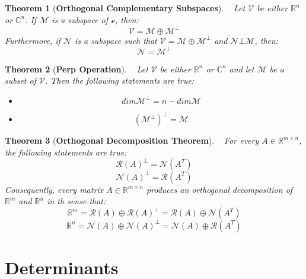 \documentclass[10.5pt]{article}
\newtheorem{theo}{Theorem}
\newenvironment{definition}[2][Definition]{\begin{trivlist}
\item[\hskip \labelsep {\bfseries #1}\hskip \labelsep {\bfseries #2.}]}{\end{trivlist}}
\begin{document}

\begin{theo}[\textbf{Orthogonal Complementary Subspaces}]
~ Let $\mathcal{V}$ be either $\mathbb{R}^n$ or $\mathbb{C}^n$. If $\mathcal{M}$ is a subspace of $\mathcal{v}$, then:
$$\mathcal{V}=\mathcal{M}\oplus \mathcal{M}^{\bot}$$
Furthermore, if $\mathcal{N}$ is a subspace such that $\mathcal{V}=\mathcal{M}\oplus \mathcal{M}^{\bot}$ and $\mathcal{N}\bot \mathcal{M}$, then:
$$\mathcal{N}= \mathcal{M}^{\bot}$$
\end{theo}

\begin{theo}[\textbf{Perp Operation}]
~ Let $\mathcal{V}$ be either $\mathbb{R}^n$ or $\mathbb{C}^n$ and let $\mathcal{M}$ be a subset of $\mathcal{V}$. Then the following statements are true:
\begin{itemize}
\item $$dim\mathcal{M}^{\bot}=n-dim\mathcal{M}$$
\item $$(\mathcal{M}^{\bot})^{\bot}=\mathcal{M}$$
\end{itemize}
\end{theo}

\begin{theo}[\textbf{Orthogonal Decomposition Theorem}]
~ For every $A\in \mathbb{R}^{m\times n}$, the following statements are true:
$$\mathcal{R}(A)^{\bot}=\mathcal{N}(A^T)$$
$$\mathcal{N}(A)^{\bot}=\mathcal{R}(A^T)$$
Consequently, every matrix $A\in \mathbb{R}^{m\times n}$ produces an orthogonal decomposition of $\mathbb{R}^m$ and $\mathbb{R}^n$ in th sense that:
$$\mathbb{R}^m=\mathcal{R}(A)\oplus \mathcal{R}(A)^{\bot}=\mathcal{R}(A)\oplus \mathcal{N}(A^T)$$
$$\mathbb{R}^n=\mathcal{N}(A)\oplus \mathcal{N}(A)^{\bot}=\mathcal{N}(A)\oplus \mathcal{R}(A^T)$$
\end{theo}
\pagebreak

\section{Determinants}
\end{document}
